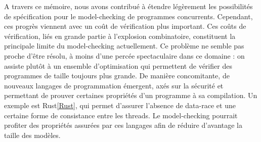 A travers ce mémoire, nous avons contribué à étendre légèrement les possibilités
de spécification pour le model-checking de programmes concurrents. Cependant,
ces progrès viennent avec un coût de vérification plus important. Ces coûts de
vérification, liés en grande partie à l'explosion combinatoire, constituent la
principale limite du model-checking actuellement. Ce problème ne semble pas
proche d'être résolu, à moins d'une percée spectaculaire dans ce domaine : on
assiste plutôt à un ensemble d'optimisation qui permettent de vérifier des
programmes de taille toujours plus grande. De manière concomitante, de nouveaux
langages de programmation émergent, axés sur la sécurité et permettant de
prouver certaines propriétés d'un programme à sa compilation. Un exemple est
Rust\ref{Rust}, qui permet d'assurer l'absence de data-race et une certaine
forme de consistance entre les threads. Le model-checking pourrait profiter des
propriétés assurées par ces langages afin de réduire d'avantage la taille des
modèles.